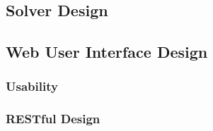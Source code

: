 \subsection{Solver Design}

\subsection{Web User Interface Design}

\subsubsection{Usability}

\subsubsection{RESTful Design}